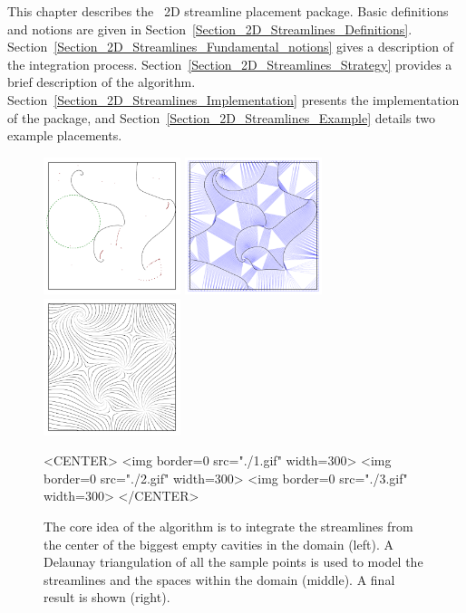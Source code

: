 \newcommand{\streamlinecomment}[1]{}

This chapter describes the \cgal\ 2D streamline placement package.
Basic definitions and notions are given in
Section~\ref{Section_2D_Streamlines_Definitions}.
Section~\ref{Section_2D_Streamlines_Fundamental_notions} gives a
description of the integration
process. Section~\ref{Section_2D_Streamlines_Strategy} provides a
brief description of the algorithm.
Section~\ref{Section_2D_Streamlines_Implementation} presents the
implementation of the package, and
Section~\ref{Section_2D_Streamlines_Example} details two example
placements.

\begin{figure}[h!]
\begin{ccTexOnly}
\begin{center}
\includegraphics[width=4cm]{Stream_lines_2/1} \hspace*{0.5cm} 
\includegraphics[width=4cm]{Stream_lines_2/2} \hspace*{0.5cm} 
\includegraphics[width=4cm]{Stream_lines_2/3}
\end{center}
\end{ccTexOnly}

\label{illustration}
\begin{ccHtmlOnly}
<CENTER>
<img border=0 src="./1.gif" width=300>
<img border=0 src="./2.gif" width=300>
<img border=0 src="./3.gif" width=300>
</CENTER>
\end{ccHtmlOnly}
\begin{center}
\caption{The core idea of the algorithm is to integrate the
streamlines from the center of the biggest empty cavities in the
domain (left). A Delaunay triangulation of all the sample points is
used to model the streamlines and the spaces within the domain
(middle). A final result is shown (right).}
\end{center}
\end{figure}

